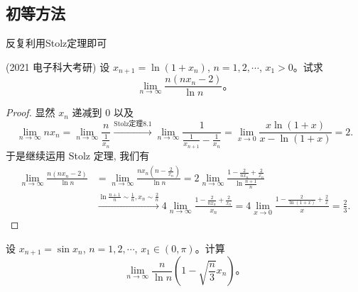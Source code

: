 \documentclass[lang=cn,10pt,thmcnt=section]{elegantbook}
\begin{document}
\subsection{初等方法}
反复利用Stolz定理即可
\begin{example}
	(2021 电子科大考研) 设 $x_{n+1} = \ln(1+x_n)$, $n=1,2,\cdots$, $x_1>0$。试求 
\[
\lim_{n\to\infty}\frac{n(nx_n-2)}{\ln n}。
\]

\end{example}
\begin{proof}
	显然 $x_n$ 递减到 0 以及
    $$
    \lim_{n \to \infty} n x_n = \lim_{n \to \infty} \frac{n}{\frac{1}{x_n}} \xrightarrow{\text{Stolz定理8.1}} \lim_{n \to \infty} \frac{1}{\frac{1}{x_{n+1}} - \frac{1}{x_n}} = \lim_{x \to 0} \frac{x \ln(1+x)}{x - \ln(1+x)} = 2.
    $$
    于是继续运用 Stolz 定理, 我们有
    \begin{align*}
        \lim_{n \to \infty} \frac{n(nx_n - 2)}{\ln n} &= \lim_{n \to \infty} \frac{nx_n \left(n - \frac{2}{x_n}\right)}{\ln n} = 2 \lim_{n \to \infty} \frac{1 - \frac{2}{nx_n} + \frac{2}{x_n}}{\ln \frac{n+1}{n}} \\
        &\xrightarrow{\ln \frac{n+1}{n} \sim \frac{1}{n}, x_n \sim \frac{2}{n}} 4 \lim_{n \to \infty} \frac{1 - \frac{2}{nx_n} + \frac{2}{x_n}}{x_n} = 4 \lim_{x \to 0} \frac{1 - \frac{2}{\ln(1+x)} + \frac{2}{x}}{x} = \frac{2}{3}.
    \end{align*}


\end{proof}
\begin{example}
	设 $x_{n+1}=\sin x_n$, $n=1,2,\cdots$, $x_1\in (0,\pi)$。计算
\[
\lim_{n\to\infty}\frac{n}{\ln n}\left(1-\sqrt{\frac{n}{3}}x_n\right)。
\]
\end{example}
\end{document}
